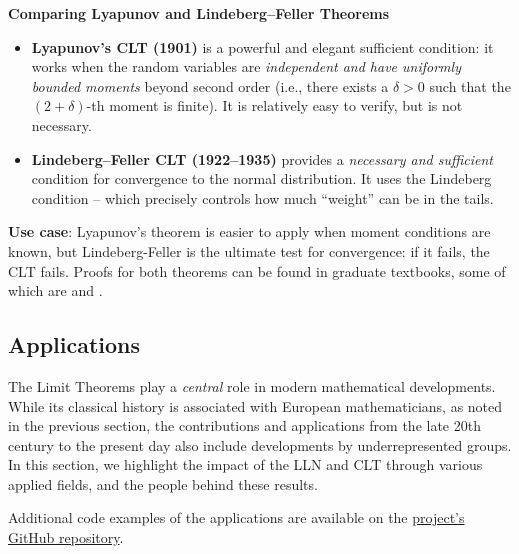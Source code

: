 \vspace{1em}
\noindent\textbf{Comparing Lyapunov and Lindeberg–Feller Theorems}
\begin{itemize}
    \item \textbf{Lyapunov’s CLT (1901)} is a powerful and elegant sufficient condition: it works when the random variables are \textit{independent and have uniformly bounded moments} beyond second order (i.e., there exists a \( \delta > 0 \) such that the \( (2 + \delta) \)-th moment is finite). It is relatively easy to verify, but is not necessary.

    \item \textbf{Lindeberg–Feller CLT (1922–1935)} provides a \emph{necessary and sufficient} condition for convergence to the normal distribution. It uses the Lindeberg condition -- which precisely controls how much “weight” can be in the tails.
\end{itemize}
\textbf{Use case}: Lyapunov’s theorem is easier to apply when moment conditions are known, but Lindeberg-Feller is the ultimate test for convergence: if it fails, the CLT fails.
Proofs for both theorems can be found in graduate textbooks, some of which are \cite{billingsley2013convergence} and \cite{feller1971introduction}.



\subsection{Applications}

The Limit Theorems play a \textit{central} role in modern mathematical developments. While its classical history is associated with European mathematicians, as noted in the previous section, the contributions and applications from the late 20th century to the present day also include developments by underrepresented groups. In this section, we highlight the impact of the LLN and CLT through various applied fields, and the people behind these results. 

Additional code examples of the applications are available on the \href{https://github.com/Ivelina0/History-of-Mathematics}{project's GitHub repository}.

